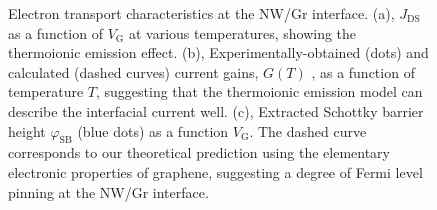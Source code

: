 \begin{figure}[htbp]
\centering
{}
\caption{\label{fig:small-main-5}
Electron transport characteristics at the NW/Gr interface. (a), \(J_{\mathrm{DS}}\) as a function of \(V_{\mathrm{G}}\) at various temperatures, showing the thermoionic emission effect. (b), Experimentally-obtained (dots) and calculated (dashed curves) current gains, \(G(T)\) , as a function of temperature \(T\), suggesting that the thermoionic emission model can describe the interfacial current well. (c), Extracted Schottky barrier height \(\varphi_{\mathrm{SB}}\) (blue dots) as a function \(V_{\mathrm{G}}\). The dashed curve corresponds to our theoretical prediction using the elementary electronic properties of graphene, suggesting a degree of Fermi level pinning at the NW/Gr interface.}
\end{figure}

\begin{figure}[htbp]
\centering
{}
\caption{\label{fig:small-main-5} }
\end{figure}



